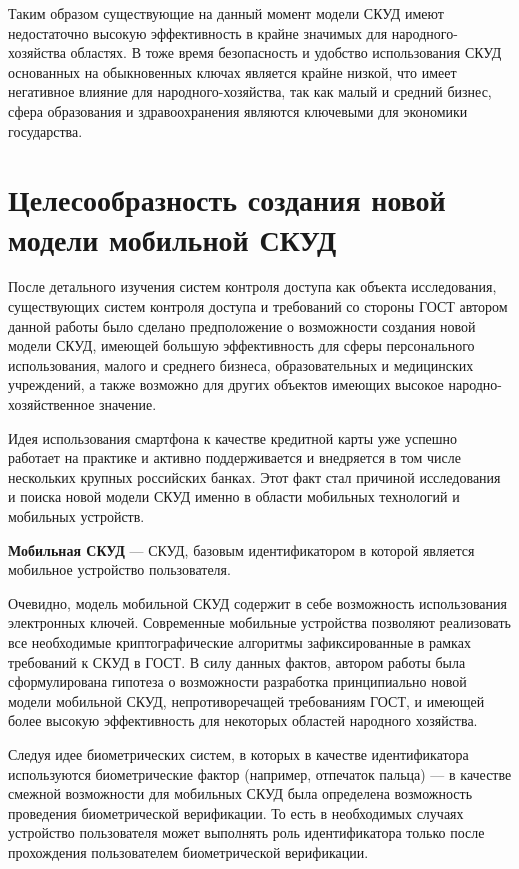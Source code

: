 Таким образом существующие на данный момент модели СКУД имеют недостаточно высокую эффективность в крайне значимых для народного-хозяйства областях. В тоже время безопасность и удобство использования СКУД основанных на обыкновенных ключах является крайне низкой, что имеет негативное влияние для народного-хозяйства, так как малый и средний бизнес, сфера образования и здравоохранения являются ключевыми для экономики государства.

\section{Целесообразность создания новой модели мобильной СКУД} \label{sect1_2}

После детального изучения систем контроля доступа как объекта исследования, существующих систем контроля доступа и требований со стороны ГОСТ автором данной работы было сделано предположение о возможности создания новой модели СКУД, имеющей большую эффективность для сферы персонального использования, малого и среднего бизнеса, образовательных и медицинских учреждений, а также возможно для других объектов имеющих высокое народно-хозяйственное значение.

Идея использования смартфона к качестве кредитной карты уже успешно работает на практике и активно поддерживается и внедряется в том числе нескольких крупных российских банках. Этот факт стал причиной исследования и поиска новой модели СКУД именно в области мобильных технологий и мобильных устройств.

\medskip

\textbf{Мобильная СКУД} — СКУД, базовым идентификатором в которой является мобильное устройство пользователя.

Очевидно, модель мобильной СКУД содержит в себе возможность использования электронных ключей. Современные мобильные устройства позволяют реализовать все необходимые криптографические алгоритмы зафиксированные в рамках требований к СКУД в ГОСТ. В силу данных фактов, автором работы была сформулирована гипотеза о возможности разработка принципиально новой модели мобильной СКУД, непротиворечащей требованиям ГОСТ, и имеющей более высокую эффективность для некоторых областей народного хозяйства.

Следуя идее биометрических систем, в которых в качестве идентификатора используются биометрические фактор (например, отпечаток пальца) — в качестве смежной возможности для мобильных СКУД была определена возможность проведения биометрической верификации. То есть в необходимых случаях устройство пользователя может выполнять роль идентификатора только после прохождения пользователем биометрической верификации.

